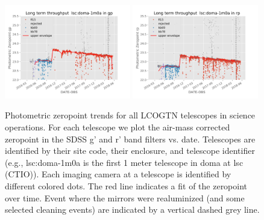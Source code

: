 \documentclass[draft]{spieman}
\begin{document}
\begin{figure}
\includegraphics[width=0.49\textwidth]{images/photzptrend-lsc-doma-1m0a-gp.png}  \hspace*{\fill}
\includegraphics[width=0.49\textwidth]{images/photzptrend-lsc-doma-1m0a-rp.png} \\[1ex]

\caption{\label{fig_zpLSC} Photometric zeropoint trends for all LCOGTN telescopes in science
operations. For each telescope we plot the air-mass corrected zeropoint in the SDSS g' and r' band
filters vs. date. Telescopes are identified by their site code, their enclosure, and telescope
identifier (e.g., lsc:doma-1m0a is the first 1 meter telescope in doma at lsc (CTIO)). Each imaging
camera at a telescope is identified by different colored dots. The red line indicates a fit of the
zeropoint over time. Event where the mirrors were realuminized (and some selected cleaning events)
are indicated by a vertical dashed grey line.}

\end{figure}
\end{document}
